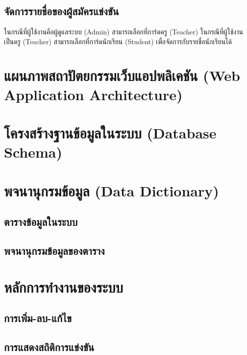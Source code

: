 \subsection{จัดการรายชื่อของผู้สมัครแข่งขัน}

ในกรณีที่ผู้ใช้งานคือผู้ดูแลระบบ (Admin) สามารถเลือกที่การ์ดครู (Teacher)
ในกรณีที่ผู้ใช้งานเป็นครู (Teacher) สามารถเลือกที่การ์ดนักเรียน (Student) เพื่อจัดการกับรายชื่อนักเรียนได้

\section{แผนภาพสถาปัตยกรรมเว็บแอปพลิเคชัน (Web Application Architecture)}

\section{โครงสร้างฐานข้อมูลในระบบ (Database Schema)}

\section{พจนานุกรมข้อมูล (Data Dictionary)}

\subsection{ตารางข้อมูลในระบบ}

\subsection{พจนานุกรมข้อมูลของตาราง}

\section{หลักการทำงานของระบบ}

\subsection{การเพิ่ม-ลบ-แก้ไข}

\subsection{การแสดงสถิติการแข่งขัน}